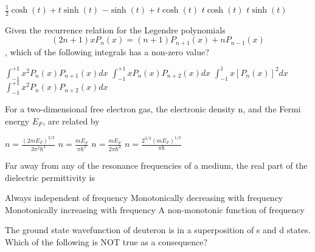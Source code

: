 \documentclass{exam}
\begin{document}
\begin{questions}
\begin{choices}
	\begin{multicols}{2}
	 \choice $\frac{1}{2}\cosh(t)+t\sinh(t)$ \choice $-\sinh(t)+t\cosh(t)$
	\choice $t\cosh(t)$ \choice $t\sinh(t)$
	\end{multicols}
\end{choices}

\question Given the recurrence relation for the Legendre polynomials $$(2n+1) x P_n(x)=(n+1) P_{n+1}(x)+nP_{n-1}(x)$$, which of the following integrals has a non-zero value?\hfill{}

\begin{choices}
	\begin{multicols}{2}
	 \choice $\int_{-1}^{+1}x^{2}P_{n}(x)P_{n+1}(x)dx$ \choice $\int_{-1}^{+1}x P_{n}(x)P_{n+2}(x)dx$
	\choice $\int_{-1}^{1}x[P_{n}(x)]^{2}dx$ \choice $\int_{-1}^{+1}x^{2}P_{n}(x)P_{n+2}(x)dx$
	\end{multicols}
\end{choices}

\question For a two-dimensional free electron gas, the electronic density n, and the Fermi energy $E_F$, are related by\hfill{}

\begin{choices}
	\begin{multicols}{2}
	 \choice $n=\frac{(2mE_{F})^{3/2}}{3\pi^{2}\hbar^{3}}$ \choice $n=\frac{mE_{F}}{\pi\hbar^{2}}$
	\choice $n=\frac{mE_{F}}{2\pi\hbar^{2}}$ \choice $n=\frac{2^{3/2}(mE_{F})^{1/2}}{\pi\hbar}$
	\end{multicols}
\end{choices}

\question Far away from any of the resonance frequencies of a medium, the real part of the dielectric permittivity is\hfill{}

\begin{choices}
	\begin{multicols}{2}
	 \choice Always independent of frequency \choice Monotonically decreasing with frequency
	\choice Monotonically increasing with frequency \choice A non-monotonic function of frequency
	\end{multicols}
\end{choices}

\question The ground state wavefunction of deuteron is in a superposition of s and d states. Which of the following is NOT true as a consequence?\hfill{}


\end{questions}
\end{document}
